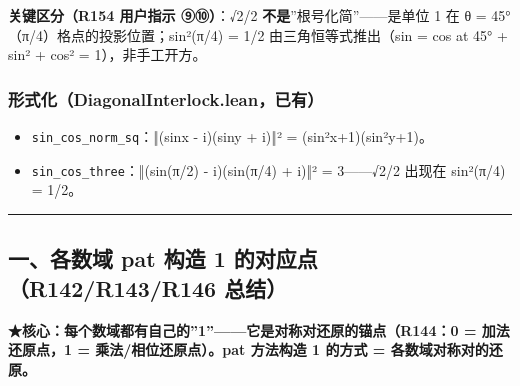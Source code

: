 \documentclass[
]{article}
\providecommand{\tightlist}{%
  \setlength{\itemsep}{0pt}\setlength{\parskip}{0pt}}
\begin{document}
\textbf{关键区分（R154 用户指示 ⑨⑩）}：√2/2
\textbf{不是}''根号化简''------是单位 1 在 θ =
45°（π/4）格点的投影位置；sin²(π/4) = 1/2 由三角恒等式推出（sin = cos at
45° + sin² + cos² = 1），非手工开方。

\subsubsection{形式化（DiagonalInterlock.lean，已有）}\label{ux5f62ux5f0fux5316diagonalinterlock.leanux5df2ux6709}

\begin{itemize}
\tightlist
\item
  \texttt{sin\_cos\_norm\_sq}：‖(sinx - i)(siny + i)‖² =
  (sin²x+1)(sin²y+1)。
\item
  \texttt{sin\_cos\_three}：‖(sin(π/2) - i)(sin(π/4) + i)‖² =
  3------√2/2 出现在 sin²(π/4) = 1/2。
\end{itemize}

\begin{center}\rule{0.5\linewidth}{0.5pt}\end{center}

\subsection{一、各数域 pat 构造 1 的对应点（R142/R143/R146
总结）}\label{ux4e00ux5404ux6570ux57df-pat-ux6784ux9020-1-ux7684ux5bf9ux5e94ux70b9r142r143r146-ux603bux7ed3}

\textbf{★核心：每个数域都有自己的''1''------它是对称对还原的锚点（R144：0
= 加法还原点，1 = 乘法/相位还原点）。pat 方法构造 1 的方式 =
各数域对称对的还原。}
\end{document}

